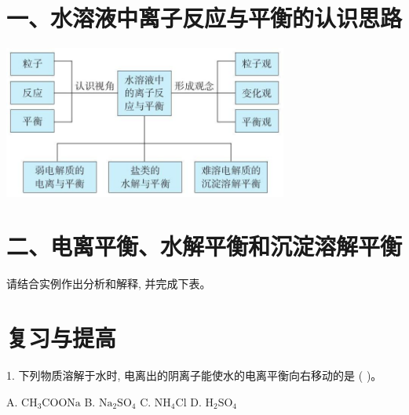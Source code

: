 \documentclass[10pt]{article}
\begin{document}
\section*{一、水溶液中离子反应与平衡的认识思路}

\begin{center}
\includegraphics[max width=0.7\textwidth]{images/0190da9d-8bfd-732f-bc2c-0b21d0f13b91_93_497085.jpg}
\end{center}

\section*{二、电离平衡、水解平衡和沉淀溶解平衡}

请结合实例作出分析和解释, 并完成下表。

\begin{center}
\end{center}

\section*{复习与提高}

1. 下列物质溶解于水时, 电离出的阴离子能使水的电离平衡向右移动的是 ( )。

A. \({\mathrm{{CH}}}_{3}\mathrm{{COONa}}\) B. \({\mathrm{{Na}}}_{2}{\mathrm{{SO}}}_{4}\) C. \({\mathrm{{NH}}}_{4}\mathrm{{Cl}}\) D. \({\mathrm{H}}_{2}{\mathrm{{SO}}}_{4}\)
\end{document}
